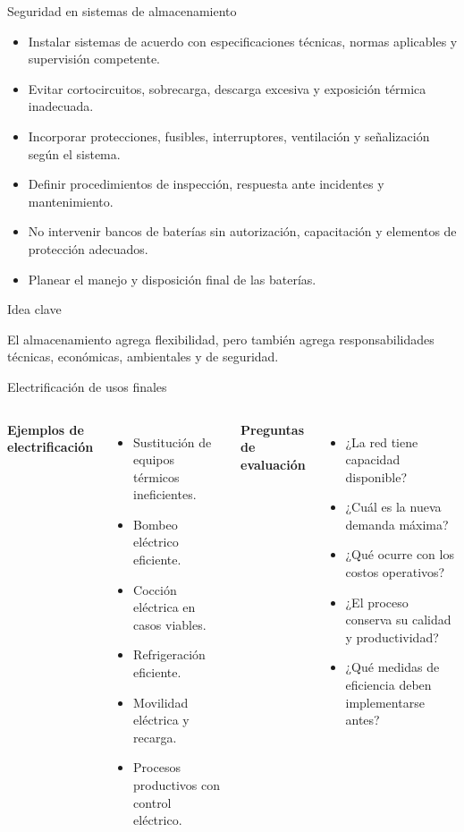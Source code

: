 \documentclass[aspectratio=169,10pt]{beamer}
\newcommand{\idea}[1]{
\begin{block}{Idea clave}
#1
\end{block}
}
\begin{document}
\begin{frame}{Seguridad en sistemas de almacenamiento}
\begin{itemize}
    \item Instalar sistemas de acuerdo con especificaciones técnicas, normas aplicables y supervisión competente.
    \item Evitar cortocircuitos, sobrecarga, descarga excesiva y exposición térmica inadecuada.
    \item Incorporar protecciones, fusibles, interruptores, ventilación y señalización según el sistema.
    \item Definir procedimientos de inspección, respuesta ante incidentes y mantenimiento.
    \item No intervenir bancos de baterías sin autorización, capacitación y elementos de protección adecuados.
    \item Planear el manejo y disposición final de las baterías.
\end{itemize}

\idea{
El almacenamiento agrega flexibilidad, pero también agrega responsabilidades técnicas, económicas, ambientales y de seguridad.
}
\end{frame}

\begin{frame}{Electrificación de usos finales}
\begin{columns}
\textbf{Ejemplos de electrificación}
\begin{itemize}
    \item Sustitución de equipos térmicos ineficientes.
    \item Bombeo eléctrico eficiente.
    \item Cocción eléctrica en casos viables.
    \item Refrigeración eficiente.
    \item Movilidad eléctrica y recarga.
    \item Procesos productivos con control eléctrico.
\end{itemize}

\textbf{Preguntas de evaluación}
\begin{itemize}
    \item ¿La red tiene capacidad disponible?
    \item ¿Cuál es la nueva demanda máxima?
    \item ¿Qué ocurre con los costos operativos?
    \item ¿El proceso conserva su calidad y productividad?
    \item ¿Qué medidas de eficiencia deben implementarse antes?
\end{itemize}
\end{columns}
\end{frame}
\end{document}
